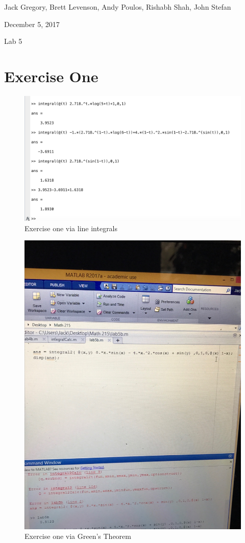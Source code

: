 \documentclass[11pt]{article}
\begin{document}
{\Large\noindent Jack Gregory, Brett Levenson, Andy Poulos, Rishabh Shah, John Stefan

\noindent December 5, 2017

\noindent Lab 5 \\}

\section*{Exercise One}
\begin{figure}[H]
	\includegraphics[width=\textwidth]{1M}
	\caption*{Exercise one via line integrals}
\end{figure}
\begin{figure}[H]
	\includegraphics[width=\textwidth]{1G}
	\caption*{Exercise one via Green's Theorem}
\end{figure}
\end{document}
